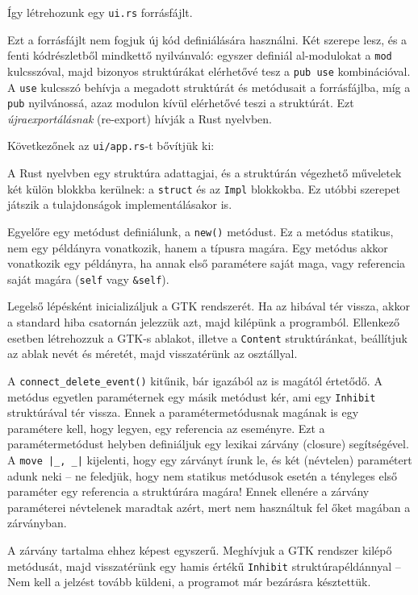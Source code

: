Így létrehozunk egy \texttt{ui.rs} forrásfájlt.



Ezt a forrásfájlt nem fogjuk új kód definiálására használni.
Két szerepe lesz, és a fenti kódrészletből mindkettő nyilvánvaló: 
egyszer definiál al-modulokat a \texttt{mod} kulcsszóval,
majd bizonyos struktúrákat elérhetővé tesz a \texttt{pub use} kombinációval.
A \texttt{use} kulcsszó behívja a megadott struktúrát és metódusait a forrásfájlba,
míg a \texttt{pub} nyilvánossá, azaz modulon kívül elérhetővé teszi a struktúrát.
Ezt \textit{újraexportálásnak} (re-export) hívják a Rust nyelvben.

Következőnek az \texttt{ui/app.rs}-t bővítjük ki:



A Rust nyelvben egy struktúra adattagjai, és a struktúrán végezhető műveletek két külön blokkba
kerülnek: a \texttt{struct} és az \texttt{Impl} blokkokba.
Ez utóbbi szerepet játszik a tulajdonságok implementálásakor is.

Egyelőre egy metódust definiálunk, a \texttt{new()} metódust.
Ez a metódus statikus, nem egy példányra vonatkozik, hanem a típusra magára.
Egy metódus akkor vonatkozik egy példányra, ha annak első paramétere saját maga, vagy referencia saját magára
(\texttt{self} vagy \verb+&self+).

Legelső lépésként inicializáljuk a GTK rendszerét.
Ha az hibával tér vissza, akkor a standard hiba csatornán jelezzük azt, majd kilépünk a programból.
Ellenkező esetben létrehozzuk a GTK-s ablakot, illetve a \texttt{Content} struktúránkat,
beállítjuk az ablak nevét és méretét, majd visszatérünk az osztállyal.

A \verb+connect_delete_event()+ kitűnik, bár igazából az is magától értetődő.
A metódus egyetlen paraméternek egy másik metódust kér, ami egy \texttt{Inhibit} struktúrával tér vissza.
Ennek a paramétermetódusnak magának is egy paramétere kell, hogy legyen, egy referencia az eseményre.
Ezt a paramétermetódust helyben definiáljuk egy lexikai zárvány (closure) segítségével.
A \verb+move |_, _|+ kijelenti, hogy egy zárványt írunk le, és két (névtelen) paramétert adunk neki --
ne feledjük, hogy nem statikus metódusok esetén a tényleges első paraméter egy referencia a struktúrára magára!
Ennek ellenére a zárvány paraméterei névtelenek maradtak azért, mert nem használtuk fel őket magában a zárványban.

A zárvány tartalma ehhez képest egyszerű.
Meghívjuk a GTK rendszer kilépő metódusát, majd visszatérünk egy hamis értékű \texttt{Inhibit} struktúrapéldánnyal --
Nem kell a jelzést tovább küldeni, a programot már bezárásra késztettük.




